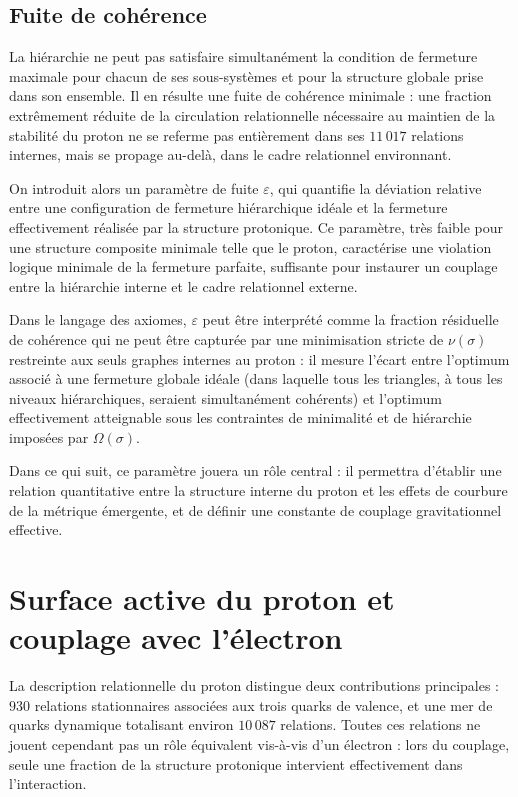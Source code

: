 \documentclass[11pt,a4paper]{article}
\begin{document}
\subsection{Fuite de cohérence}

La hiérarchie ne peut pas satisfaire simultanément la condition de fermeture maximale pour chacun de ses sous-systèmes et pour la structure globale prise dans son ensemble. Il en résulte une fuite de cohérence minimale : une fraction extrêmement réduite de la circulation relationnelle nécessaire au maintien de la stabilité du proton ne se referme pas entièrement dans ses \(11\,017\) relations internes, mais se propage au-delà, dans le cadre relationnel environnant.

On introduit alors un paramètre de fuite \(\varepsilon\), qui quantifie la déviation relative entre une configuration de fermeture hiérarchique idéale et la fermeture effectivement réalisée par la structure protonique. Ce paramètre, très faible pour une structure composite minimale telle que le proton, caractérise une violation logique minimale de la fermeture parfaite, suffisante pour instaurer un couplage entre la hiérarchie interne et le cadre relationnel externe.

Dans le langage des axiomes, \(\varepsilon\) peut être interprété comme la fraction résiduelle de cohérence qui ne peut être capturée par une minimisation stricte de \(\nu\left(\sigma\right)\) restreinte aux seuls graphes internes au proton : il mesure l’écart entre l’optimum associé à une fermeture globale idéale (dans laquelle tous les triangles, à tous les niveaux hiérarchiques, seraient simultanément cohérents) et l’optimum effectivement atteignable sous les contraintes de minimalité et de hiérarchie imposées par \(\Omega\left(\sigma\right)\).

Dans ce qui suit, ce paramètre jouera un rôle central : il permettra d’établir une relation quantitative entre la structure interne du proton et les effets de courbure de la métrique émergente, et de définir une constante de couplage gravitationnel effective.

\section{Surface active du proton et couplage avec l’électron}

La description relationnelle du proton distingue deux contributions principales : \(930\) relations stationnaires associées aux trois quarks de valence, et une mer de quarks dynamique totalisant environ \(10\,087\) relations. Toutes ces relations ne jouent cependant pas un rôle équivalent vis-à-vis d’un électron : lors du couplage, seule une fraction de la structure protonique intervient effectivement dans l’interaction.
\end{document}
